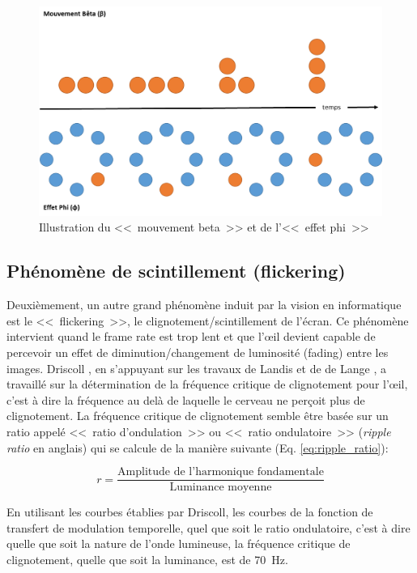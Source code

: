 	\begin{figure}
		\centering
		\includegraphics[scale=.55]{Figures/MouvementBetaEffetPhi}
		\caption{Illustration du <<~mouvement beta~>> et de l'<<~effet phi~>>}
		\label{fig:beta_phi}
	\end{figure}
	
	\subsection{Phénomène de scintillement (flickering)}
	\par Deuxièmement, un autre grand phénomène induit par la vision en informatique est le <<~flickering~>>, le clignotement/scintillement de l'écran. Ce phénomène intervient quand le frame rate est trop lent et que l'œil devient capable de percevoir un effet de diminution/changement de luminosité (fading) entre les images. Driscoll \citep{driscoll_eyes_1978}, en s'appuyant sur les travaux de Landis \citep{landis_determinants_1954} et de de Lange \citep{de_lange_dzn_research_1958,de_lange_dzn_research_1958-1}, a travaillé sur la détermination de la fréquence critique de clignotement pour l'œil, c'est à dire la fréquence au delà de laquelle le cerveau ne perçoit plus de clignotement. La fréquence critique de clignotement semble être basée sur un ratio appelé <<~ratio d'ondulation~>> ou <<~ratio ondulatoire~>> (\textit{ripple ratio} en anglais) qui se calcule de la manière suivante (Eq. \ref{eq:ripple_ratio}):
	
	\begin{equation}
	r = \frac{\textrm{Amplitude de l'harmonique fondamentale}}{\textrm{Luminance moyenne}}
	\label{eq:ripple_ratio}
	\end{equation}
	
	\par En utilisant les courbes établies par Driscoll, les courbes de la fonction de transfert de modulation temporelle, quel que soit le ratio ondulatoire, c'est à dire quelle que soit la nature de l'onde lumineuse, la fréquence critique de clignotement, quelle que soit la luminance, est de 70~Hz.
	
